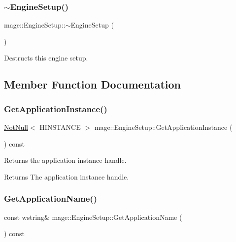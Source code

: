 \subsubsection{\texorpdfstring{$\sim$\+Engine\+Setup()}{~EngineSetup()}}
{\footnotesize\ttfamily mage\+::\+Engine\+Setup\+::$\sim$\+Engine\+Setup (\begin{DoxyParamCaption}{ }\end{DoxyParamCaption})\hspace{0.3cm}{\ttfamily [default]}}

Destructs this engine setup. 

\subsection{Member Function Documentation}
\hypertarget{classmage_1_1_engine_setup_a278a3df908b5b369a597812de4010532}{}\label{classmage_1_1_engine_setup_a278a3df908b5b369a597812de4010532} 
\subsubsection{\texorpdfstring{Get\+Application\+Instance()}{GetApplicationInstance()}}
{\footnotesize\ttfamily \hyperlink{namespacemage_a8769f9d670d6b585ea306cb1062af94b}{Not\+Null}$<$ H\+I\+N\+S\+T\+A\+N\+CE $>$ mage\+::\+Engine\+Setup\+::\+Get\+Application\+Instance (\begin{DoxyParamCaption}{ }\end{DoxyParamCaption}) const\hspace{0.3cm}{\ttfamily [noexcept]}}

Returns the application instance handle.

\begin{DoxyReturn}{Returns}
The application instance handle. 
\end{DoxyReturn}
\hypertarget{classmage_1_1_engine_setup_ab79015dba68069256ed42595b30a5728}{}\label{classmage_1_1_engine_setup_ab79015dba68069256ed42595b30a5728} 
\subsubsection{\texorpdfstring{Get\+Application\+Name()}{GetApplicationName()}}
{\footnotesize\ttfamily const wstring\& mage\+::\+Engine\+Setup\+::\+Get\+Application\+Name (\begin{DoxyParamCaption}{ }\end{DoxyParamCaption}) const\hspace{0.3cm}{\ttfamily [noexcept]}}


